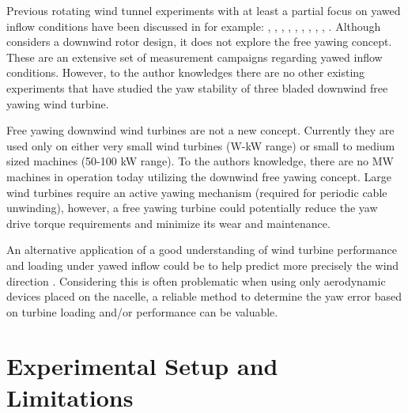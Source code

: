 \documentclass[a4paper]{jpconf}
\begin{document}

Previous rotating wind tunnel experiments with at least a partial focus on yawed inflow conditions have been discussed in for example: \cite{haans_measurement_2005}, \cite{haans_measurement_2005-1}, \cite{bracchi_downwind_2014}, \cite{schepers_engineering_2012}, \cite{schepers_final_2012}, \cite{mexnext_iea_web}, \cite{schepers_model_2007}, \cite{hand_unsteady_2001}, \cite{loland_wind_2011}, \cite{haans_wind_2011}. Although \cite{bracchi_downwind_2014} considers a downwind rotor design, it does not explore the free yawing concept. These are an extensive set of measurement campaigns regarding yawed inflow conditions. However, to the author knowledges there are no other existing experiments that have studied the yaw stability of three bladed downwind free yawing wind turbine.


Free yawing downwind wind turbines are not a new concept. Currently they are used only on either very small wind turbines (W-kW range) or small to medium sized machines (50-100 kW range). To the authors knowledge, there are no MW machines in operation today utilizing the downwind free yawing concept. Large wind turbines require an active yawing mechanism (required for periodic cable unwinding), however, a free yawing turbine could potentially reduce the yaw drive torque requirements and minimize its wear and maintenance.

An alternative application of a good understanding of wind turbine performance and loading under yawed inflow could be to help predict more precisely the wind direction \cite{bottasso_validation_2015}. Considering this is often problematic when using only aerodynamic devices placed on the nacelle, a reliable method to determine the yaw error based on turbine loading and/or performance can be valuable.


\section{Experimental Setup and Limitations}
\end{document}
